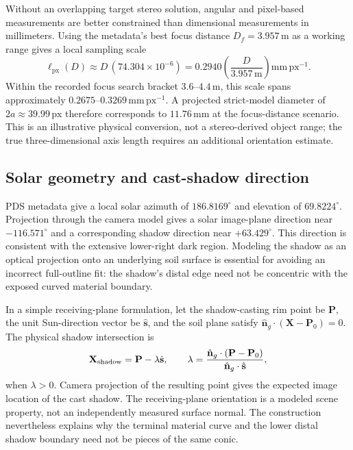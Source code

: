 \documentclass[11pt,letterpaper]{article}
\newcommand{\px}{\,\mathrm{px}}
\newcommand{\mat}[1]{\mathbf{#1}}
\begin{document}
Without an overlapping target stereo solution, angular and pixel-based measurements are better constrained than dimensional measurements in millimeters. Using the metadata's best focus distance \(D_f=3.957\,\mathrm{m}\) as a working range gives a local sampling scale
\begin{equation}
 \ell_{\mathrm{px}}(D)\approx D\,(74.304\times10^{-6})
 = 0.2940\left(\frac{D}{3.957\,\mathrm m}\right)\mathrm{mm\,px^{-1}}.
 \label{eq:scale}
\end{equation}
Within the recorded focus search bracket \(3.6\)--\(4.4\,\mathrm m\), this scale spans approximately \(0.2675\)--\(0.3269\,\mathrm{mm\,px^{-1}}\). A projected strict-model diameter of \(2a\approx39.99\px\) therefore corresponds to \(11.76\,\mathrm{mm}\) at the focus-distance scenario. This is an illustrative physical conversion, not a stereo-derived object range; the true three-dimensional axis length requires an additional orientation estimate.

\subsection{Solar geometry and cast-shadow direction}

PDS metadata give a local solar azimuth of \(186.8169^\circ\) and elevation of \(69.8224^\circ\). Projection through the camera model gives a solar image-plane direction near \(-116.571^\circ\) and a corresponding shadow direction near \(+63.429^\circ\). This direction is consistent with the extensive lower-right dark region. Modeling the shadow as an optical projection onto an underlying soil surface is essential for avoiding an incorrect full-outline fit: the shadow's distal edge need not be concentric with the exposed curved material boundary.

In a simple receiving-plane formulation, let the shadow-casting rim point be \(\mat P\), the unit Sun-direction vector be \(\hat{\mat s}\), and the soil plane satisfy \(\hat{\mat n}_g\cdot(\mat X-\mat P_0)=0\). The physical shadow intersection is
\begin{equation}
 \mat X_{\rm shadow}=\mat P-\lambda\hat{\mat s},\qquad
 \lambda=\frac{\hat{\mat n}_g\cdot(\mat P-\mat P_0)}{\hat{\mat n}_g\cdot\hat{\mat s}},
 \label{eq:shadow}
\end{equation}
when \(\lambda>0\). Camera projection of the resulting point gives the expected image location of the cast shadow. The receiving-plane orientation is a modeled scene property, not an independently measured surface normal. The construction nevertheless explains why the terminal material curve and the lower distal shadow boundary need not be pieces of the same conic.
\end{document}
